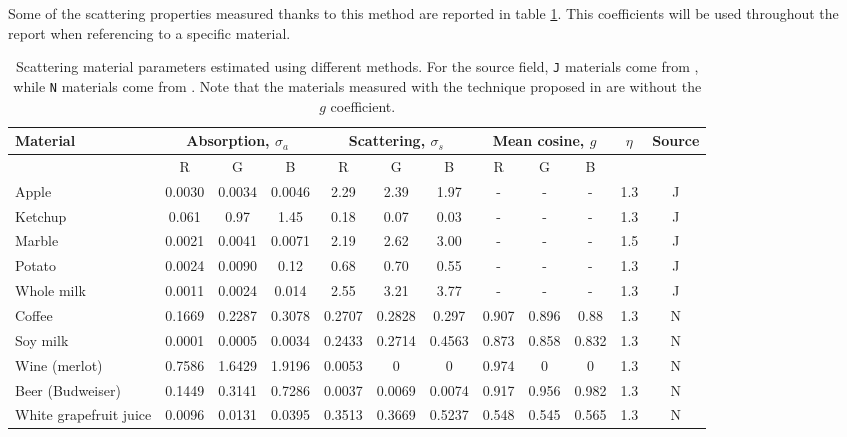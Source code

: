 Some of the scattering properties measured thanks to this method are reported in table \ref{table:scatteringcoefficients}. This coefficients will be used throughout the report when referencing to a specific material.
\clearpage
\begin{landscape}
\renewcommand{\arraystretch}{1.8}
\begin{table}[!ht]
    \centering
    \begin{tabular}{|l|ccc|ccc|ccc|c|c|}
    \hline
    \multirow{2}{*}{Material}               & \multicolumn{3}{|c|}{Absorption, $\sigma_a$}     & \multicolumn{3}{|c|}{Scattering, $\sigma_s$}     & \multicolumn{3}{|c|}{Mean cosine, $g$}    & \multirow{2}{*}{$\eta$} & \multirow{2}{*}{Source} \\ \hline
               &R& G      & B     & R & G      & B      & R   & G     & B     &  &  \\ \hline
    {Apple}                  & 0.0030 & 0.0034 & 0.0046 & 2.29   & 2.39   & 1.97   & -     & -     & -     & 1.3    & J      \\
    {Ketchup}                & 0.061  & 0.97   & 1.45   & 0.18   & 0.07   & 0.03   & -     & -     & -     & 1.3    & J      \\
    {Marble}                 & 0.0021 & 0.0041 & 0.0071 & 2.19   & 2.62   & 3.00   & -     & -     & -     & 1.5    & J      \\
    {Potato}                 & 0.0024 & 0.0090 & 0.12   & 0.68   & 0.70   & 0.55   & -     & -     & -     & 1.3    & J      \\
   { Whole milk}             & 0.0011 & 0.0024 & 0.014  & 2.55   & 3.21   & 3.77   & -     & -     & -     & 1.3    & J      \\
    {Coffee}                 & 0.1669 & 0.2287 & 0.3078 & 0.2707 & 0.2828 & 0.297  & 0.907 & 0.896 & 0.88  & 1.3    & N    \\
    {Soy milk}               & 0.0001 & 0.0005 & 0.0034 & 0.2433 & 0.2714 & 0.4563 & 0.873 & 0.858 & 0.832 & 1.3    & N      \\
    {Wine (merlot)   }       & 0.7586 & 1.6429 & 1.9196 & 0.0053 & 0      & 0      & 0.974 & 0     & 0     & 1.3    & N      \\
    {Beer (Budweiser)}       & 0.1449 & 0.3141 & 0.7286 & 0.0037 & 0.0069 & 0.0074 & 0.917 & 0.956 & 0.982 & 1.3    & N      \\
    {White grapefruit juice} & 0.0096 & 0.0131 & 0.0395 & 0.3513 & 0.3669 & 0.5237 & 0.548 & 0.545 & 0.565 & 1.3    & N      \\ \hline
    \end{tabular}
		\caption{Scattering material parameters estimated using different methods. For the source field, \texttt{J} materials come from \cite{Jensen:2001:PMS:383259.383319}, while \texttt{N} materials come from \cite{Narasimhan:2006:ASP:1141911.1141986}. Note that the materials measured with the technique proposed in \cite{Jensen:2001:PMS:383259.383319} are without the $g$ coefficient.}
		\label{table:scatteringcoefficients}
\end{table}
\end{landscape}
\clearpage

